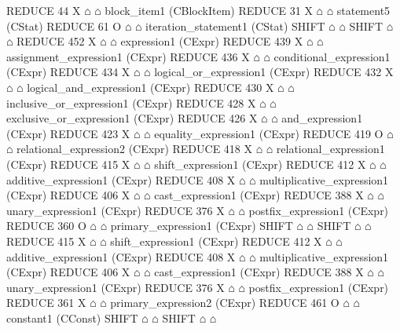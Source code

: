 \begin{isabellebody}
\begin{isamarkuptext}
\begin{isar}
        REDUCE 44 X $\house$ $\house$ block_item1  (CBlockItem) 
         REDUCE 31 X $\house$ $\house$ statement5  (CStat) 
          REDUCE 61 O $\house$ $\house$ iteration_statement1  (CStat) 
           SHIFT $\house$ $\house$ 
           SHIFT $\house$ $\house$ 
           REDUCE 452 X $\house$ $\house$ expression1  (CExpr) 
            REDUCE 439 X $\house$ $\house$ assignment_expression1  (CExpr) 
             REDUCE 436 X $\house$ $\house$ conditional_expression1  (CExpr) 
              REDUCE 434 X $\house$ $\house$ logical_or_expression1  (CExpr) 
               REDUCE 432 X $\house$ $\house$ logical_and_expression1  (CExpr) 
                REDUCE 430 X $\house$ $\house$ inclusive_or_expression1  (CExpr) 
                 REDUCE 428 X $\house$ $\house$ exclusive_or_expression1  (CExpr) 
                  REDUCE 426 X $\house$ $\house$ and_expression1  (CExpr) 
                   REDUCE 423 X $\house$ $\house$ equality_expression1  (CExpr) 
                    REDUCE 419 O $\house$ $\house$ relational_expression2  (CExpr) 
                     REDUCE 418 X $\house$ $\house$ relational_expression1  (CExpr) 
                      REDUCE 415 X $\house$ $\house$ shift_expression1  (CExpr) 
                       REDUCE 412 X $\house$ $\house$ additive_expression1  (CExpr) 
                        REDUCE 408 X $\house$ $\house$ multiplicative_expression1  (CExpr) 
                         REDUCE 406 X $\house$ $\house$ cast_expression1  (CExpr) 
                          REDUCE 388 X $\house$ $\house$ unary_expression1  (CExpr) 
                           REDUCE 376 X $\house$ $\house$ postfix_expression1  (CExpr) 
                            REDUCE 360 O $\house$ $\house$ primary_expression1  (CExpr) 
                             SHIFT $\house$ $\house$ 
                     SHIFT $\house$ $\house$ 
                     REDUCE 415 X $\house$ $\house$ shift_expression1  (CExpr) 
                      REDUCE 412 X $\house$ $\house$ additive_expression1  (CExpr) 
                       REDUCE 408 X $\house$ $\house$ multiplicative_expression1  (CExpr) 
                        REDUCE 406 X $\house$ $\house$ cast_expression1  (CExpr) 
                         REDUCE 388 X $\house$ $\house$ unary_expression1  (CExpr) 
                          REDUCE 376 X $\house$ $\house$ postfix_expression1  (CExpr) 
                           REDUCE 361 X $\house$ $\house$ primary_expression2  (CExpr) 
                            REDUCE 461 O $\house$ $\house$ constant1  (CConst) 
                             SHIFT $\house$ $\house$ 
           SHIFT $\house$ $\house$ 

\end{isar}
\end{isamarkuptext}
\end{isabellebody}
